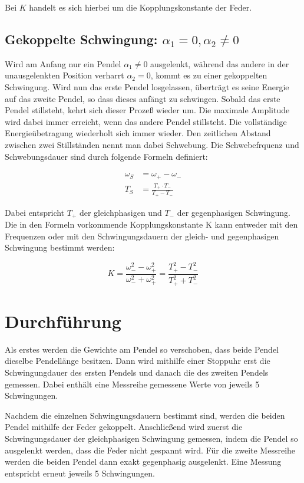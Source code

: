 Bei $K$ handelt es sich hierbei um die Kopplungskonstante der Feder.

\subsection{Gekoppelte Schwingung: \texorpdfstring{$\alpha_1 = 0, \alpha_2 \neq 0$}{}}

Wird am Anfang nur ein Pendel $\alpha_1 \neq 0$ ausgelenkt, während das andere in der unausgelenkten
Position verharrt $\alpha_2 = 0$, kommt es zu einer gekoppelten Schwingung. Wird nun das erste Pendel
losgelassen, überträgt es seine Energie auf das zweite Pendel, so dass dieses anfängt zu schwingen.
Sobald das erste Pendel stillsteht, kehrt sich dieser Prozeß wieder um. Die maximale Amplitude
wird dabei immer erreicht, wenn das andere Pendel stillsteht. Die vollständige Energieübetragung
wiederholt sich immer wieder.
Den zeitlichen Abstand zwischen zwei Stillständen nennt man dabei Schwebung. Die Schwebefrquenz
und Schwebungsdauer sind durch folgende Formeln definiert:

\begin{align}
   \omega_S &= \omega_+ - \omega_- \\
   T_S      &= \frac{T_+ \cdot T_-}{T_+ - T_-}
\end{align}

Dabei entspricht $T_+$ der gleichphasigen und $T_-$ der gegenphasigen Schwingung. Die in den Formeln
vorkommende Kopplungskonstante K kann entweder mit den Frequenzen oder mit
den Schwingungsdauern der gleich- und gegenphasigen Schwingung bestimmt werden:

\begin{equation}
  K = \frac{\omega_-^2 - \omega_+^2}{\omega_-^2 + \omega_+^2}
    = \frac{T_+^2 - T_-^2}{T_+^2 + T_-^2}
\end{equation}

\section{Durchführung}

Als erstes werden die Gewichte am Pendel so verschoben, dass beide Pendel dieselbe Pendellänge
besitzen. Dann wird mithilfe einer Stoppuhr erst die Schwingungdauer des ersten Pendels und danach
die des zweiten Pendels gemessen. Dabei enthält eine Messreihe gemessene Werte von jeweils 5
Schwingungen.

Nachdem die einzelnen Schwingungsdauern bestimmt sind, werden die beiden Pendel mithilfe der Feder
gekoppelt. Anschließend wird zuerst die Schwingungsdauer der gleichphasigen Schwingung gemessen, indem
die Pendel so ausgelenkt werden, dass die Feder nicht gespannt wird. Für die zweite Messreihe werden die
beiden Pendel dann exakt gegenphasig ausgelenkt. Eine Messung entspricht erneut jeweils 5 Schwingungen.

